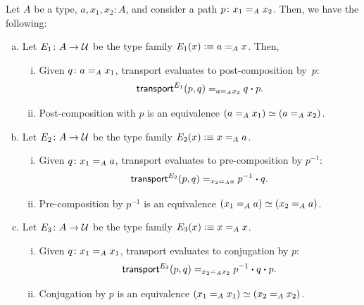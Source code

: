 \begin{lem}\label{lem:path-equivalences}
    Let\/ $A$ be a type, $a,x_1,x_2\colon A$, and consider a path\/ $p\colon x_1\eq{A}x_2$. Then, we have the following:
    \begin{enumerate}[a),font=\upshape]
        \item Let\/ $E_1\colon A\to\univ$ be the type family\/ $E_1(x)\mathrel{\vcentcolon}\equiv a\mathrel{=_{A}}x$. Then,
        \begin{enumerate}[i),font=\upshape]
            \item Given\/ $q\colon a\eq{A}x_1$, transport evaluates to post-composition by\/~$p$:
            \[
                \mathsf{transport}^{E_1}(p,q)\mathrel{=_{a\mathrel{=_{A}}x_2}}q\mathbin{\boldsymbol{\cdot}} p.
            \]
            \item Post-composition with $p$\/ is an equivalence\/ $(a\mathrel{=_{A}}x_1)\simeq(a\mathrel{=_{A}}x_2)$.
        \end{enumerate}
        
        \item Let\/ $E_2\colon A\to\univ$ be the type family\/ $E_2(x)\mathrel{\vcentcolon}\equiv x\mathrel{=_{A}}a$.
        \begin{enumerate}[i),font=\upshape]
            \item Given\/ $q\colon x_1\eq{A}a$, transport evaluates to pre-composition by\/ $p^{-1}$:
            \[
                \mathsf{transport}^{E_2}(p,q)\mathrel{=_{x_2\mathrel{=_{A}}a}}p^{-1}\mathbin{\boldsymbol{\cdot}} q.
            \]
            
            \item Pre-composition by\/ $p^{-1}$ is an equivalence\/ $(x_1\mathrel{=_{A}}a)\simeq(x_2\mathrel{=_{A}}a)$.
        \end{enumerate} 
        
        \item Let\/ $E_3\colon A\to\univ$ be the type family\/ $E_3(x)\mathrel{\vcentcolon}\equiv x\mathrel{=_{A}}x$.
        \begin{enumerate}[i),font=\upshape]
            \item Given\/ $q\colon x_1\eq{A}x_1$, transport evaluates to conjugation by\/ $p$:
            \[
                \mathsf{transport}^{E_3}(p,q)\mathrel{=_{x_2\mathrel{=_{A}}x_2}}p^{-1}\mathbin{\boldsymbol{\cdot}} q\mathbin{\boldsymbol{\cdot}} p.
            \]

            \item Conjugation by\/ $p$ is an equivalence\/ $(x_1\mathrel{=_{A}}x_1)\simeq(x_2\mathrel{=_{A}}x_2)$.
        \end{enumerate}
    \end{enumerate}
\end{lem}

